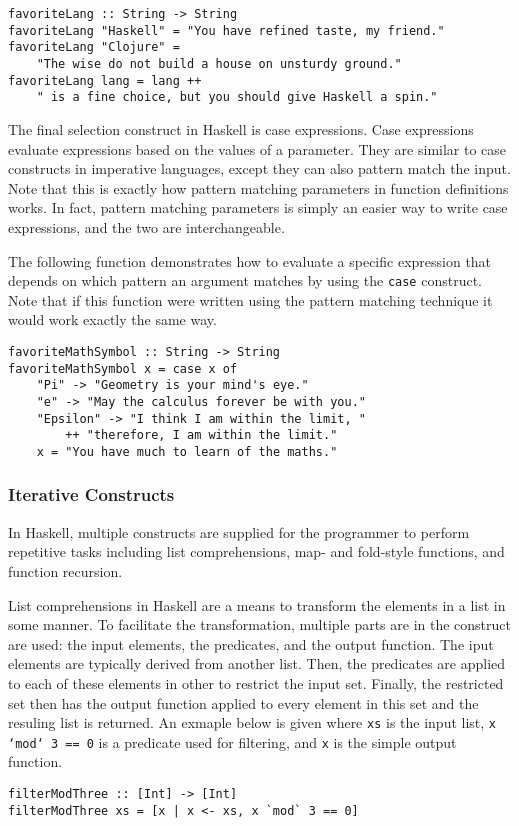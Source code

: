 \documentclass[titlepage,12pt]{article}
\begin{document}
\begin{verbatim}
favoriteLang :: String -> String
favoriteLang "Haskell" = "You have refined taste, my friend."
favoriteLang "Clojure" = 
    "The wise do not build a house on unsturdy ground."
favoriteLang lang = lang ++ 
    " is a fine choice, but you should give Haskell a spin."
\end{verbatim}

The final selection construct in Haskell is case expressions. Case expressions evaluate expressions based on 
the values of a parameter. They are similar to case constructs in imperative languages, except they can also pattern 
match the input. Note that this is exactly how pattern matching parameters in function definitions works. In 
fact, pattern matching parameters is simply an easier way to write case expressions, and the two are interchangeable. 

The following function demonstrates how to evaluate a specific expression that depends on which pattern 
an argument matches by using the \texttt{case} construct. Note that if this function were written using the 
pattern matching technique it would work exactly the same way. 

\begin{verbatim}
favoriteMathSymbol :: String -> String
favoriteMathSymbol x = case x of
    "Pi" -> "Geometry is your mind's eye."
    "e" -> "May the calculus forever be with you."
    "Epsilon" -> "I think I am within the limit, "
        ++ "therefore, I am within the limit."
    x = "You have much to learn of the maths."
\end{verbatim}

\subsubsection{Iterative Constructs}

In Haskell, multiple constructs are supplied for the programmer to perform repetitive tasks including
list comprehensions, map- and fold-style functions, and function recursion.

List comprehensions in Haskell are a means to transform the elements in a list in some manner.
To facilitate the transformation, multiple parts are in the construct are used: the input elements, the
predicates, and the output function.  The iput elements are typically derived from another list.  Then,
the predicates are applied to each of these elements in other to restrict the input set.  Finally, the
restricted set then has the output function applied to every element in this set and the resuling list
is returned.  An exmaple below is given where \texttt{xs} is the input list, \texttt{x `mod` 3 == 0} is
a predicate used for filtering, and \texttt{x} is the simple output function.
\begin{verbatim}
filterModThree :: [Int] -> [Int]
filterModThree xs = [x | x <- xs, x `mod` 3 == 0]
\end{verbatim}
\end{document}
